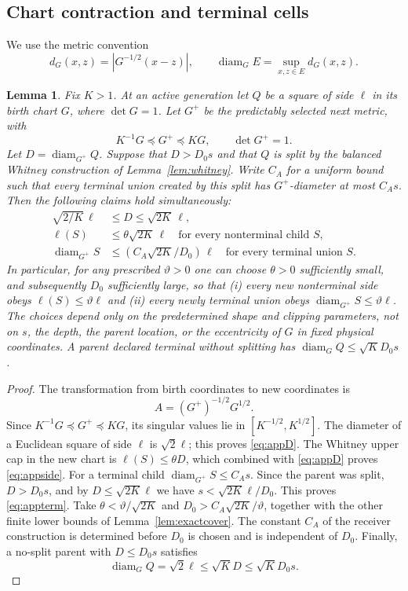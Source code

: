 \documentclass[11pt]{article}
\newtheorem{lemma}[lemma]{Lemma}
\theoremstyle{definition}
\theoremstyle{remark}
\numberwithin{equation}{section}
\begin{document}
\subsection{Chart contraction and terminal cells}\label{app:birthchart}
We use the metric convention
\[
 d_G(x,z)=|G^{-1/2}(x-z)|,\qquad
 \operatorname{diam}_G E=\sup_{x,z\in E}d_G(x,z).
\]
\begin{lemma}\label{lem:birthchart}
Fix $K>1$. At an active generation let $Q$ be a square of side $\ell$
in its birth chart $G$, where $\det G=1$. Let $G^+$ be the
predictably selected next metric, with
\[
 K^{-1}G\preceq G^+\preceq KG,\qquad \det G^+=1.
\]
Let $D=\operatorname{diam}_{G^+}Q$. Suppose that $D>D_0s$
and that $Q$ is split by the balanced Whitney construction of
Lemma~\ref{lem:whitney}. Write $C_A$ for a uniform bound such that
every terminal union created by this split has $G^+$-diameter at
most $C_As$. Then the following claims hold simultaneously:
\begin{align}
 \sqrt{2/K}\,\ell&\le D\le \sqrt{2K}\,\ell,\label{eq:appD}\\
 \ell(S)&\le \theta\sqrt{2K}\,\ell
 \quad\text{for every nonterminal child }S,\label{eq:appside}\\
 \operatorname{diam}_{G^+}S
 &\le (C_A\sqrt{2K}/D_0)\,\ell
 \quad\text{for every terminal union }S.\label{eq:appterm}
\end{align}
In particular, for any prescribed $\vartheta>0$ one can choose
$\theta>0$ sufficiently small, and subsequently $D_0$ sufficiently
large, so that (i) every new nonterminal side obeys
$\ell(S)\le\vartheta\ell$ and (ii) every newly terminal
union obeys $\operatorname{diam}_{G^+}S\le\vartheta\ell$.
The choices depend only on the predetermined shape and clipping
parameters, not on $s$, the depth, the parent location, or the
eccentricity of $G$ in fixed physical coordinates.
A parent declared terminal without splitting has
$\operatorname{diam}_G Q\le\sqrt K D_0s$.
\end{lemma}
\begin{proof}
The transformation from birth coordinates to new coordinates is
\[
 A=(G^+)^{-1/2}G^{1/2}.
\]
Since
$K^{-1}G\preceq G^+\preceq KG$, its singular values lie in
$[K^{-1/2},K^{1/2}]$. The diameter of a Euclidean square of
side $\ell$ is $\sqrt2\ell$; this proves \eqref{eq:appD}.
The Whitney upper cap in the new chart is $\ell(S)\le\theta D$,
which combined with \eqref{eq:appD} proves \eqref{eq:appside}.
For a terminal child $\operatorname{diam}_{G^+}S\le C_As$.
Since the parent was split, $D>D_0s$, and by
$D\le\sqrt{2K}\ell$ we have
$s<\sqrt{2K}\ell/D_0$. This proves \eqref{eq:appterm}.
Take $\theta<\vartheta/\sqrt{2K}$ and
$D_0>C_A\sqrt{2K}/\vartheta$, together with the other finite lower
bounds of Lemma~\ref{lem:exactcover}. The constant $C_A$ of the
receiver construction is determined before $D_0$ is chosen and is
independent of $D_0$. Finally, a no-split parent with $D\le D_0s$ satisfies
\[\operatorname{diam}_G Q=\sqrt2\ell\le\sqrt K D\le\sqrt K D_0s.\]
\end{proof}
\end{document}
